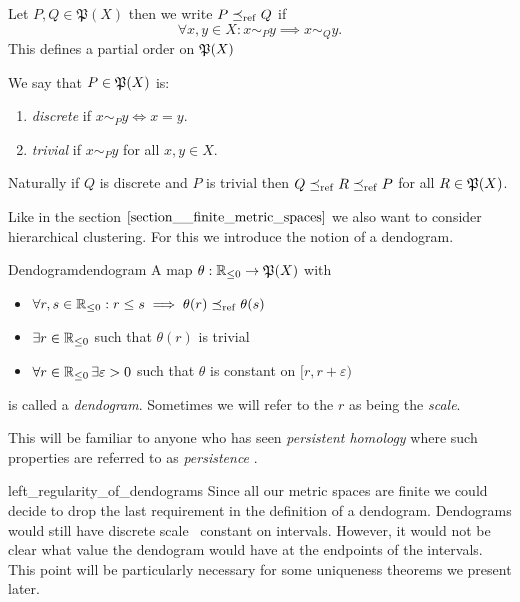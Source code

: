 \begin{definition}{}{}
Let $P, Q \in \mathfrak{P}(X)$ then we write $P \refines Q$ if
\begin{equation*}
    \forall x,y \in X: x \sim_P y \implies x \sim_Q y.
\end{equation*}
This defines a partial order on $\P(X)$
\end{definition}

\begin{definition}{}{}
We say that $P \in \P(X)$ is:
\begin{enumerate}
    \item \emph{discrete} if $x \sim_P y \iff x = y$.
    \item \emph{trivial} if $x \sim_P y$ for all $x,y \in X$.
\end{enumerate}
\end{definition}

Naturally if $Q$ is discrete and $P$ is trivial then $Q \refines R \refines P$ for all $R \in \P(X)$.

Like in the section $\ref{section__finite_metric_spaces}$ we also want to consider hierarchical clustering.
For this we introduce the notion of a dendogram.

\begin{definition}{Dendogram}{dendogram}
A map $\theta: \R_{\leq0} \to \mathfrak{P}(X)$ with
\begin{itemize}
    \item $\forall r,s \in \R_{\leq0}: r \leq s \implies  \theta(r) \refines \theta(s)$
    \item $\exists r \in \R_{\leq0}$ such that $\theta(r)$ is trivial
    \item $\forall r \in \R_{\leq0} \,\exists \varepsilon > 0$ such that $\theta$ is constant on $[r, r + \varepsilon)$
\end{itemize}
is called a \emph{dendogram}. Sometimes we will refer to the $r$ as being the \emph{scale}.
\end{definition}

This will be familiar to anyone who has seen \emph{persistent homology} where such properties are referred to as \emph{persistence} \cite{Carlsson2014}. 

\begin{myremark}{}{left_regularity_of_dendograms}
Since all our metric spaces are finite we could decide to drop the last requirement in the definition of a dendogram. Dendograms would still have discrete scale \ie\ constant on intervals.
However, it would not be clear what value the dendogram would have at the endpoints of the intervals.
This point will be particularly necessary for some uniqueness theorems we present later.
\end{myremark}

